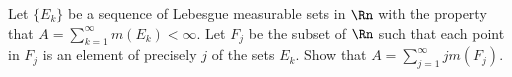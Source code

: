 Let $\{E_k\}$ be a sequence of Lebesgue measurable sets in $\Rn$ with
the property that $A=\sum_{k=1}^{\infty}m(E_k)<\infty$. Let $F_j$ be
the subset of $\Rn$ such that each point in $F_j$ is an element of
precisely $j$ of the sets $E_k$. Show that
$A=\sum_{j=1}^{\infty}jm(F_j)$.
